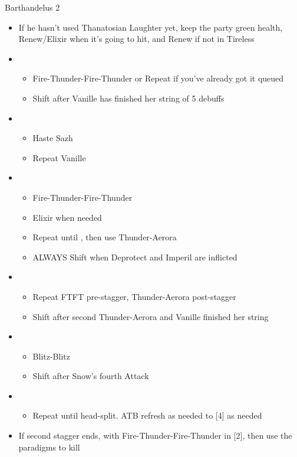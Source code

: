 \begin{battle}{Barthandelus 2}
\begin{multicols}{2}
\begin{itemize}
    \columnbreak
    \item If he hasn't used Thanatosian Laughter yet, keep the party green health, Renew/Elixir when it's going to hit, and Renew if not in Tireless
    \item \fifth
    \begin{itemize}
        \item Fire-Thunder-Fire-Thunder or Repeat if you've already got it queued
        \item Shift after Vanille has finished her string of 5 debuffs
    \end{itemize}
    \item \first
    \begin{itemize}
        \item Haste Sazh
        \item Repeat Vanille
    \end{itemize}
    \item \fifth
    \begin{itemize}
        \item Fire-Thunder-Fire-Thunder
        \item Elixir when needed
        \item Repeat until \stagger, then use Thunder-Aerora
        \item ALWAYS Shift when Deprotect and Imperil are inflicted
    \end{itemize}
    \item \second
    \begin{itemize}
        \item Repeat FTFT pre-stagger, Thunder-Aerora post-stagger
        \item Shift after second Thunder-Aerora and Vanille finished her string
    \end{itemize}
    \item \fourth
    \begin{itemize}
        \item Blitz-Blitz
        \item Shift after Snow's fourth Attack
    \end{itemize}
    \item \sixth
    \begin{itemize}
        \item Repeat until head-split. ATB refresh as needed to [4] as needed
    \end{itemize}
    \item If second stagger ends, \stagger with Fire-Thunder-Fire-Thunder in [2], then use the \com paradigms to kill
\end{itemize}
\null
\end{multicols}
\end{battle}
